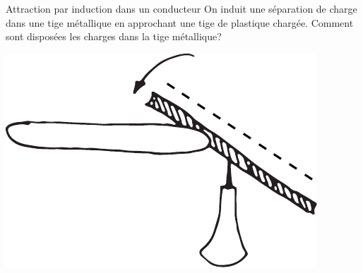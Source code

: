 \documentclass{beamer}
\begin{document}
\begin{frame}{Attraction par induction dans un conducteur}
  On induit une séparation de charge dans une tige métallique en approchant une
  tige de plastique chargée. Comment sont disposées les charges dans la tige
  métallique?
  \begin{center}
    \includegraphics[scale=0.5]{figures/tige-chargee.pdf}
  \end{center}
  \vspace{0.5cm}


\end{frame}
\end{document}
